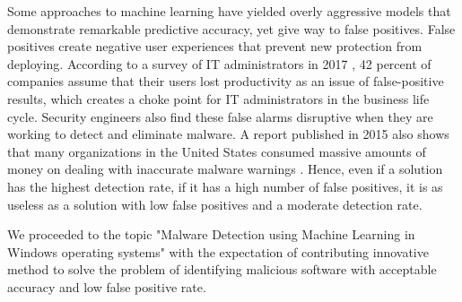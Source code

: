 Some approaches to machine learning have yielded overly aggressive models that demonstrate remarkable predictive accuracy, yet give way to false positives. False positives create negative user experiences that prevent new protection from deploying. According to a survey of IT administrators in 2017 \cite{jonathan2017survey}, 42 percent of companies assume that their users lost productivity as an issue of false-positive results, which creates a choke point for IT administrators in the business life cycle. Security engineers also find these false alarms disruptive when they are working to detect and eliminate malware. A report published in 2015 also shows that many organizations in the United States consumed massive amounts of money on dealing with inaccurate malware warnings \cite{eduard2015false}. Hence, even if a solution has the highest detection rate, if it has a high number of false positives, it is as useless as a solution with low false positives and a moderate detection rate.

We proceeded to the topic "Malware Detection using Machine Learning in Windows operating systems" with the expectation of contributing innovative method to solve the problem of identifying malicious software with acceptable accuracy and low false positive rate.
